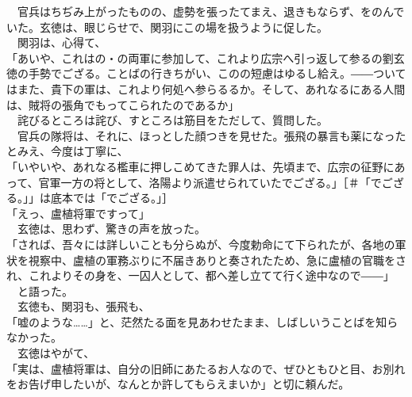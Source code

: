 \documentclass[
  paper=a5,
  fontsize=10pt,
  jafontsize=9.5pt,
  tate,                  %
  open_bracket_pos=nibu, %
]{jlreq}
\begin{document}
　官兵はちぢみ上がったものの、虚勢を張ったてまえ、退きもならず、をのんでいた。玄徳は、眼じらせで、関羽にこの場を扱うように促した。\\


　関羽は、心得て、\\


「あいや、これはの・の両軍に参加して、これより広宗へ引っ返して参るの劉玄徳の手勢でござる。ことばの行きちがい、このの短慮はゆるし給え。――ついてはまた、貴下の軍は、これより何処へ参らるるか。そして、あれなるにある人間は、賊将の張角でもってこられたのであるか」\\


　詫びるところは詫び、すところは筋目をただして、質問した。\\


　官兵の隊将は、それに、ほっとした顔つきを見せた。張飛の暴言も薬になったとみえ、今度は丁寧に、\\


「いやいや、あれなる檻車に押しこめてきた罪人は、先頃まで、広宗の征野にあって、官軍一方の将として、洛陽より派遣せられていたでござる。」［＃「でござる。」」は底本では「でござる。」］\\


「えっ、盧植将軍ですって」\\


　玄徳は、思わず、驚きの声を放った。\\


「されば、吾々には詳しいことも分らぬが、今度勅命にて下られたが、各地の軍状を視察中、盧植の軍務ぶりに不届きありと奏されたため、急に盧植の官職をされ、これよりその身を、一囚人として、都へ差し立てて行く途中なので――」\\


　と語った。\\


　玄徳も、関羽も、張飛も、\\


「嘘のような……」と、茫然たる面を見あわせたまま、しばしいうことばを知らなかった。\\


　玄徳はやがて、\\


「実は、盧植将軍は、自分の旧師にあたるお人なので、ぜひともひと目、お別れをお告げ申したいが、なんとか許してもらえまいか」と切に頼んだ。\\
\end{document}
